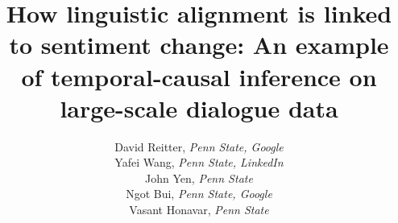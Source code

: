 \documentclass{clv3}
\begin{document}
\title{How linguistic alignment is linked to sentiment change: An example of temporal-causal inference on large-scale dialogue data}
\author{
David Reitter, {\it Penn State, Google}\\
Yafei Wang, {\it Penn State, LinkedIn}\\
John Yen, {\it Penn State}\\
Ngot Bui, {\it Penn State, Google}\\
Vasant Honavar, {\it Penn State}}


%
\end{document}
